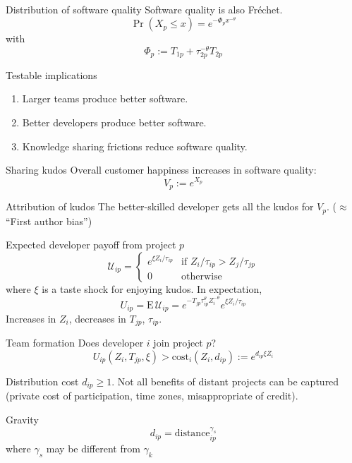 \documentclass[
  ignorenonframetext,
  aspectratio=169,
]{beamer}
\providecommand{\tightlist}{%
  \setlength{\itemsep}{0pt}\setlength{\parskip}{0pt}}
\begin{document}
\begin{frame}{Distribution of software quality}
\protect\hypertarget{distribution-of-software-quality}{}
Software quality is also Fréchet. \[
\Pr(X_p \le x) = e^{-\Phi_p x^{-\theta}}
\] with \[
\Phi_p := T_{1p} + \tau_{2p}^{-\theta}T_{2p}
\]

\begin{block}{Testable implications}
\protect\hypertarget{testable-implications}{}
\begin{enumerate}
\tightlist
\item
  Larger teams produce better software.
\item
  Better developers produce better software.
\item
  Knowledge sharing frictions reduce software quality.
\end{enumerate}
\end{block}
\end{frame}

\begin{frame}{Sharing kudos}
\protect\hypertarget{sharing-kudos}{}
Overall customer happiness increases in software quality: \[
V_p := e^{X_p}
\]

\begin{block}{Attribution of kudos}
\protect\hypertarget{attribution-of-kudos}{}
The better-skilled developer gets all the kudos for \(V_p\).
(\(\approx\) ``First author bias'')
\end{block}
\end{frame}

\begin{frame}{Expected developer payoff from project \(p\)}
\protect\hypertarget{expected-developer-payoff-from-project-p}{}
\[
\mathcal U_{ip} = \begin{cases}
e^{\xi Z_i/\tau_{ip}} & \text{if }Z_i/\tau_{ip} > Z_j/\tau_{jp}\\
0 & \text{otherwise}
\end{cases}
\] where \(\xi\) is a taste shock for enjoying kudos. In expectation, \[
U_{ip} = \text{E}\,\mathcal U_{ip} =
e^{-T_{jp}\tau_{ip}^\theta Z_i^{-\theta}}
e^{\xi Z_i/\tau_{ip}}
\] Increases in \(Z_i\), decreases in \(T_{jp}\), \(\tau_{ip}\).
\end{frame}

\begin{frame}{Team formation}
\protect\hypertarget{team-formation}{}
Does developer \(i\) join project \(p\)? \[
U_{ip}(Z_i, T_{jp}, \xi) > \text{cost}_{i}(Z_i, d_{ip}) := e^{d_{ip}\xi Z_i}
\]

\begin{block}{Distribution cost}
\protect\hypertarget{distribution-cost}{}
\(d_{ip} \ge 1\). Not all benefits of distant projects can be captured
(private cost of participation, time zones, misappropriate of credit).
\end{block}

\begin{block}{Gravity}
\protect\hypertarget{gravity-1}{}
\[
d_{ip} = \text{distance}_{ip}^{\gamma_s} 
\] where \(\gamma_s\) may be different from \(\gamma_k\)
\end{block}
\end{frame}
\end{document}
